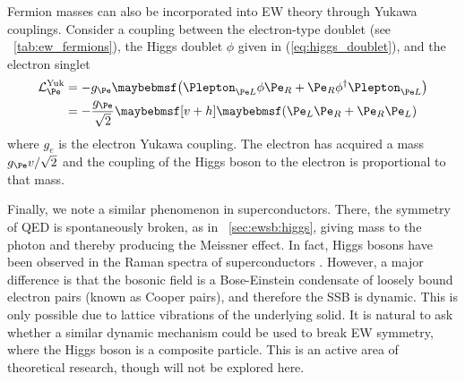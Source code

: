 Fermion masses can also be incorporated into \ac{EW} theory through Yukawa couplings.
Consider a coupling between the electron-type  doublet (see 
\Table~\ref{tab:ew_fermions}), the Higgs doublet $\phi$ given in 
(\ref{eq:higgs_doublet}), and the electron  singlet
\begin{align}
	\mathcal{L}_{\Pe}^{\text{Yuk}} &= -g_{\Pe} \parenths{\Plepton_{\Pe L} \phi \Pe_{R} + \Pe_{R} \phi^{\dagger} \Plepton_{\Pe L}} \\
	&= -\frac{g_{\Pe}}{\sqrt{2}} \sqbracs{v + h} \parenths{\Pe_{L} \Pe_{R} + \Pe_{R} \Pe_{L}}
\end{align}
where $g_e$ is the electron Yukawa coupling. The electron has acquired a mass 
$g_{\Pe}v/\sqrt{2}$ and the coupling of the Higgs boson to the electron is proportional 
to that mass.

Finally, we note a similar phenomenon in superconductors. There, the  symmetry 
of \ac{QED} is spontaneously broken, as in \Section~\ref{sec:ewsb:higgs}, giving mass to 
the photon and thereby producing the Meissner effect. In fact, Higgs bosons have been 
observed in the Raman spectra of superconductors \cite{Superconductivity}. However, a 
major difference is that the bosonic field is a Bose-Einstein condensate of loosely bound 
electron pairs (known as Cooper pairs), and therefore the \ac{SSB} is dynamic. This is 
only possible due to lattice vibrations of the underlying solid. It is natural to ask 
whether a similar dynamic mechanism could be used to break \ac{EW} symmetry, where the 
Higgs boson is a composite particle. This is an active area of theoretical research, 
though will not be explored here.
